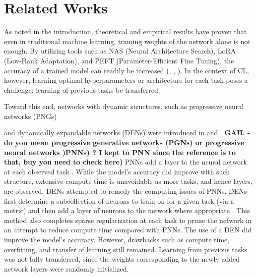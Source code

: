 \section{Related Works}
As noted in the introduction, theoretical and empirical results have proven that even in traditional machine learning, training weights of the network alone is not enough. By utilizing tools such as NAS (Neural Architecture Search), LoRA (Low-Rank Adaptation), and PEFT (Parameter-Efficient Fine Tuning), the accuracy of a trained model can readily be increased (\cite{liu2021survey}, \cite{LORAhu2022lora},  \cite{han2024parameter}). In the context of CL, however, learning optimal hyperparameters or architecture for each task poses a challenge: 
 learning of previous tasks be transferred.

Toward this end, networks with dynamic structures, such as progressive neural networks (PNGs) 

and dynamically expandable networks (DENs) were introduced in \cite{rusu2016progressive} and \cite{yoon2017lifelong}. 
\textbf{GAIL - do you mean progressive generative networks (PGNs) or progressive neural networks )PNNs) ? I kept to PNN since the reference is to that, buy you need to check here)}
PNNs add a layer to the neural network at each observed task \cite{rusu2016progressive}. While the model's accuracy did improve with such structure, extensive compute time is unavoidable as more tasks, and hence layers, are observed. DENs attempted to remedy the computing issues of PNNs. DENs first determine a subcollection of neurons to train on for a given task (via a metric) and then add a layer of neurons to the network where appropriate \cite{yoon2017lifelong}. This method also completes sparse regularization at each task to prune the network in an attempt to reduce compute time compared with PNNs. The use of a DEN did improve the model's accuracy. However, drawbacks such as compute time, overfitting, and transfer of learning still remained. Learning from previous tasks was not fully transferred, since the weights corresponding to the newly added network layers were randomly initialized. 

